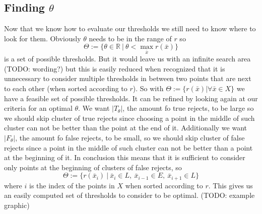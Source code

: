 \subsection{Finding $\theta$}
\label{findt}
Now that we know how to evaluate our thresholds we still need to know where to look for them. Obviously $\theta$ needs to be in the range of $r$ so
$$ \Theta := \{\theta \in \mathbb{R} \ | \ \theta < \operatorname*{max}_{\bar{x}} r(\bar{x})\}  $$
is a set of possible thresholds. But it would leave us with an infinite search area (TODO: wording?) but this is easily reduced when recognized that it is unnecessary to consider multiple thresholds in between two points that are next to each other (when sorted according to $r$). So with $\Theta := \{r(\bar{x}) | \forall \bar{x} \in X\}$ we have a feasible set of possible thresholds. It can be refined by looking again at our criteria for an optimal $\theta$. We want $|T_\theta|$, the amount fo true rejects, to be large so we should skip cluster of true rejects since choosing a point in the middle of such cluster can not be better than the point at the end of it. Additionally we want  $|F_\theta|$, the amount fo false rejects, to be small, so we should skip cluster of false rejects since a point in the middle of such cluster can not be better than a point at the beginning of it. In conclusion this means that it is sufficient to consider only points at the beginning of clusters of false rejects, so
$$ \Theta := \{r(\bar{x}_i) \ | \ \bar{x}_i \in L, \ \bar{x}_{i-1} \in E,\ \bar{x}_{i+1} \in L \} $$
where $i$ is the index of the points in $X$ when sorted according to $r$. This gives us an easily computed set of thresholds to consider to be optimal. (TODO: example graphic) 

